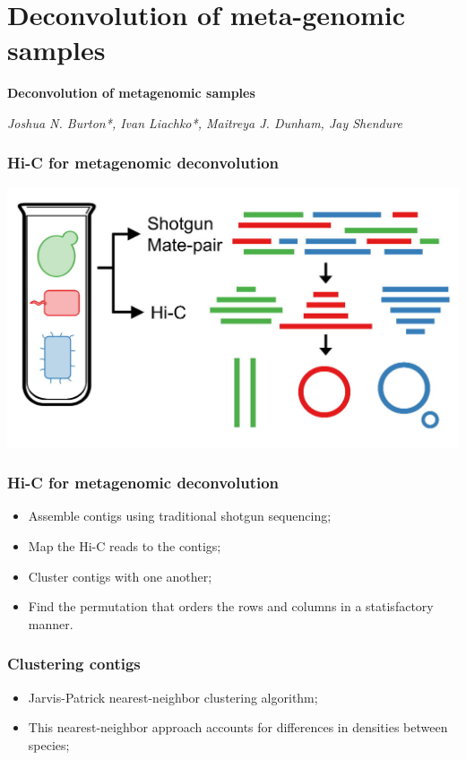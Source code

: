 \documentclass[xcolor=dvipsnames]{beamer}
\begin{document}
\section{Deconvolution of meta-genomic samples}
\begin{frame}
\Large{ \bf
Deconvolution of metagenomic samples}

\begin{flushright}
\vspace{1em}
\small

\textit{Joshua N. Burton*, Ivan Liachko*, Maitreya J. Dunham, Jay Shendure}
\end{flushright}
\end{frame}

\begin{frame}
\frametitle{Hi-C for metagenomic deconvolution}
\begin{center}
\includegraphics[width=0.75\linewidth]{figures/metagenomic_deconvolution.png}
\end{center}
\end{frame}


\begin{frame}
\frametitle{Hi-C for metagenomic deconvolution}
\begin{itemize}[label={$\bullet$}]
\item Assemble contigs using traditional shotgun sequencing;
\item Map the Hi-C reads to the contigs;
\item Cluster contigs with one another;
\item Find the permutation that orders the rows and columns in a statisfactory
manner.
\end{itemize}
\end{frame}

\begin{frame}
\frametitle{Clustering contigs}

\begin{itemize}[label={$\bullet$}]
\item Jarvis-Patrick nearest-neighbor clustering algorithm;
\item This nearest-neighbor approach accounts for differences in densities
between species;
\end{itemize}
\end{frame}
\end{document}
